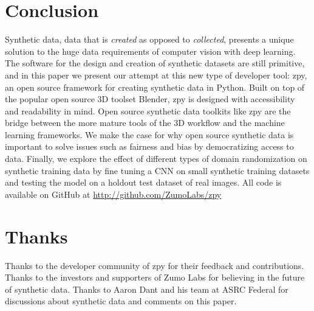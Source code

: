 \documentclass{article}
\begin{document}
\section{Conclusion}
\label{sec:conclusion}

Synthetic data, data that is \emph{created} as opposed to \emph{collected}, presents a unique solution to the huge data requirements of computer vision with deep learning. The software for the design and creation of synthetic datasets are still primitive, and in this paper we present our attempt at this new type of developer tool: zpy, an open source framework for creating synthetic data in Python. Built on top of the popular open source 3D toolset Blender, zpy is designed with accessibility and readability in mind. Open source synthetic data toolkits like zpy are the bridge between the more mature tools of the 3D workflow and the machine learning frameworks. We make the case for why open source synthetic data is important to solve issues such as fairness and bias by democratizing access to data. Finally, we explore the effect of different types of domain randomization on synthetic training data by fine tuning a CNN on small synthetic training datasets and testing the model on a holdout test dataset of real images. All code is available on GitHub at \url{http://github.com/ZumoLabs/zpy}

\section{Thanks}
\label{sec:thanks}

 Thanks to the developer community of zpy for their feedback and contributions. Thanks to the investors and supporters of Zumo Labs for believing in the future of synthetic data. Thanks to Aaron Dant and his team at ASRC Federal for discussions about synthetic data and comments on this paper.



\end{document}
